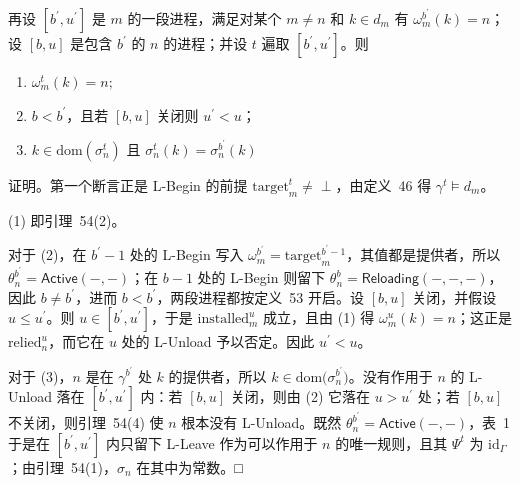 \documentclass[
  10
]{article}
\begin{document}
再设 \([ b ^ { \prime } , u ^ { \prime } ]\) 是 \(m\) 的一段进程，满足对某个 \(m \neq n\) 和 \(k \in d _ { m }\) 有 \(\omega _ { m } ^ { b ^ { \prime } } ( k ) = n\)；设 \([ b , u ]\) 是包含 \(b ^ { \prime }\) 的 \(n\) 的进程；并设 \(t\) 遍取 \([ b ^ { \prime } , u ^ { \prime } ]\)。则

\begin{enumerate}
\def\labelenumi{\arabic{enumi}.}
\item
  \(\omega _ { m } ^ { t } ( k ) = n ;\)
\item
  \(b < b ^ { \prime }\)，且若 \([ b , u ]\) 关闭则 \(u ^ { \prime } < u\)；
\item
  \(k \in \mathrm { d o m } ( \sigma _ { n } ^ { t } )\) 且 \(\sigma _ { n } ^ { t } ( k ) = \sigma _ { n } ^ { b ^ { \prime } } ( k )\)
\end{enumerate}

证明。第一个断言正是 L-Begin 的前提 \(\mathrm { t a r g e t } _ { m } ^ { t } \neq \perp\)，由定义~46 得 \(\gamma ^ { t } \models d _ { m }\)。

(1) 即引理~54(2)。

对于 (2)，在 \(b ^ { \prime } - 1\) 处的 L-Begin 写入 \(\omega _ { m } ^ { b ^ { \prime } } = \mathrm { t a r g e t } _ { m } ^ { b ^ { \prime } - 1 }\)，其值都是提供者，所以 \(\theta _ { n } ^ { b ^ { \prime } } = \mathsf { A c t i v e } ( - , - )\)；在 \(b - 1\) 处的 L-Begin 则留下 \(\theta _ { n } ^ { b } = \mathsf { R e l o a d i n g } ( - , - , - )\)，因此 \(b \neq b ^ { \prime }\)，进而 \(b < b ^ { \prime }\)，两段进程都按定义~53 开启。设 \([ b , u ]\) 关闭，并假设 \(u \leq u ^ { \prime }\)。则 \(u \in [ b ^ { \prime } , u ^ { \prime } ]\)，于是 \(\mathrm { i n s t a l l e d } _ { m } ^ { u }\) 成立，且由 (1) 得 \(\omega _ { m } ^ { u } ( k ) = n\)；这正是 \(\mathrm { r e l i e d } _ { n } ^ { u }\)，而它在 \(u\) 处的 L-Unload 予以否定。因此 \(u ^ { \prime } < u\)。

对于 (3)，\(n\) 是在 \(\gamma ^ { b ^ { \prime } }\) 处 \(k\) 的提供者，所以 \(k \in \mathrm { d o m } \bigl ( \sigma _ { n } ^ { b ^ { \prime } } \bigr )\)。没有作用于 \(n\) 的 L-Unload 落在 \([ b ^ { \prime } , u ^ { \prime } ]\) 内：若 \([ b , u ]\) 关闭，则由 (2) 它落在 \(u > u ^ { \prime }\) 处；若 \([ b , u ]\) 不关闭，则引理~54(4) 使 \(n\) 根本没有 L-Unload。既然 \(\theta _ { n } ^ { b ^ { \prime } } = \mathsf { A c t i v e } ( - , - )\)，表~1 于是在 \([ b ^ { \prime } , u ^ { \prime } ]\) 内只留下 L-Leave 作为可以作用于 \(n\) 的唯一规则，且其 \(\Psi ^ { t }\) 为 \(\mathrm { i d } _ { \Gamma }\)；由引理~54(1)，\(\sigma _ { n }\) 在其中为常数。□
\end{document}
